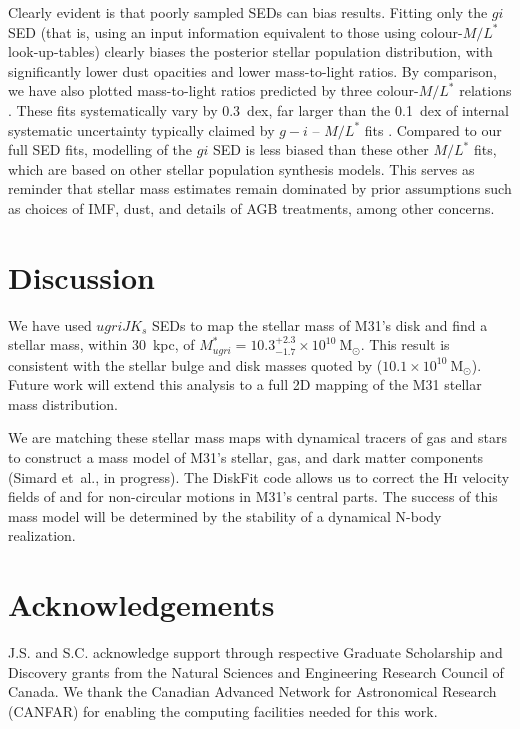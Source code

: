 \documentclass{iau}
\begin{document}
Clearly evident is that poorly sampled SEDs can bias results.
Fitting only the $gi$ SED (that is, using an input information equivalent to those using colour-$M/L^*$ look-up-tables) clearly biases the posterior stellar population distribution, with significantly lower dust opacities and lower mass-to-light ratios.
By comparison, we have also plotted mass-to-light ratios predicted by three colour-$M/L^*$ relations \citep{Zibetti:2009,Taylor:2011,Into:2013}.
These fits systematically vary by 0.3~dex, far larger than the 0.1~dex of internal systematic uncertainty typically claimed by $g-i$ -- $M/L^*$ fits \cite{Courteau:2013}.
Compared to our full SED fits, modelling of the $gi$ SED is less biased than these other $M/L^*$ fits, which are based on other stellar population synthesis models.
This serves as reminder that stellar mass estimates remain dominated by prior assumptions such as choices of IMF, dust, and details of AGB treatments, among other concerns.

\section{Discussion}

We have used $ugriJK_s$ SEDs to map the stellar mass of M31's disk and find a stellar mass, within $30$~kpc, of $M_{ugri}^{*} = 10.3^{+2.3}_{-1.7}\times 10^{10}~\mathrm{M}_\odot$.
This result is consistent with the stellar bulge and disk masses quoted by \cite{Tamm:2012} ($10.1\times10^{10}~\mathrm{M}_\odot$).
Future work will extend this analysis to a full 2D mapping of the M31 stellar mass distribution.

We are matching these stellar mass maps with dynamical tracers of gas and stars to construct a mass model of M31's stellar, gas, and dark matter components (Simard et~al., in progress). 
The DiskFit code \citep{Spekkens:2007} allows us to correct the H\textsc{i} velocity fields of \cite{Saglia:2010} and \cite{Chemin:2009} for non-circular motions in M31's central parts. 
The success of this mass model will be determined by the stability of a dynamical N-body realization.

\section*{Acknowledgements}

\noindent J.S. and S.C. acknowledge support through respective Graduate Scholarship and Discovery grants from the Natural Sciences and Engineering Research Council of Canada. We thank the Canadian Advanced Network for Astronomical Research (CANFAR) for enabling the computing facilities needed for this work.
\end{document}
